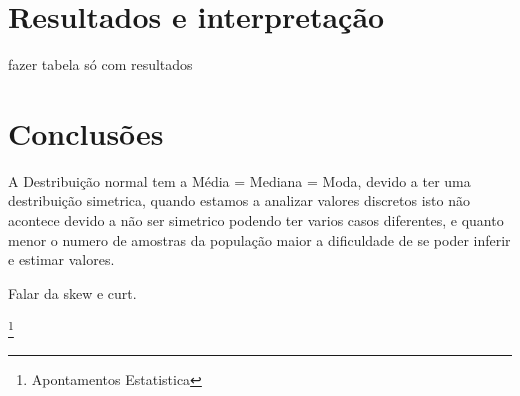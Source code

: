 \newpage




\newpage
\section{Resultados e interpretação}\label{Resultados}
fazer tabela só com resultados\\
\section{Conclusões}\label{Conclusão}
A Destribuição normal tem a Média = Mediana = Moda, devido a ter uma destribuição simetrica, quando estamos a analizar valores discretos isto não acontece devido a não ser simetrico podendo ter varios casos diferentes, e quanto menor o numero de amostras da população maior a dificuldade de se poder inferir e estimar valores.

Falar da skew e curt.


%
%
%
\listoffigures
\cite{*}

\footnote{Apontamentos Estatistica}

